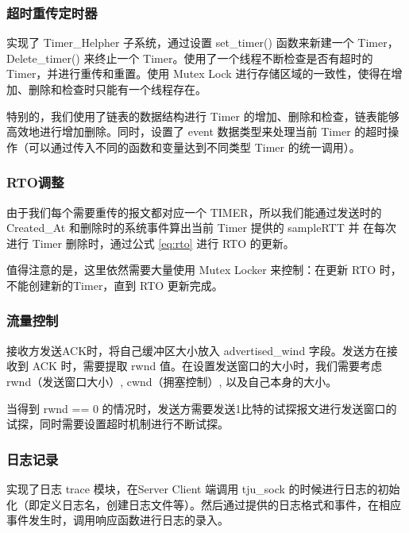 \subsubsection*{超时重传定时器}
实现了 Timer\_Helpher 子系统，通过设置 set\_timer() 函数来新建一个 Timer，Delete\_timer() 来终止一个 Timer。使用了一个线程不断检查是否有超时的Timer，并进行重传和重置。使用 Mutex Lock 进行存储区域的一致性，使得在增加、删除和检查时只能有一个线程存在。

特别的，我们使用了链表的数据结构进行 Timer 的增加、删除和检查，链表能够高效地进行增加删除。同时，设置了 event 数据类型来处理当前 Timer 的超时操作（可以通过传入不同的函数和变量达到不同类型 Timer 的统一调用）。

\subsubsection*{RTO调整}

由于我们每个需要重传的报文都对应一个 TIMER，所以我们能通过发送时的 Created\_At 和删除时的系统事件算出当前 Timer 提供的 sampleRTT 并 在每次进行 Timer 删除时，通过公式 \ref{eq:rto} 进行 RTO 的更新。

值得注意的是，这里依然需要大量使用 Mutex Locker 来控制：在更新 RTO 时，不能创建新的Timer，直到 RTO 更新完成。

\subsubsection*{流量控制}

接收方发送ACK时，将自己缓冲区大小放入 advertised\_wind 字段。发送方在接收到 ACK 时，需要提取 rwnd 值。在设置发送窗口的大小时，我们需要考虑 rwnd（发送窗口大小）, cwnd（拥塞控制）, 以及自己本身的大小。

当得到 rwnd == 0 的情况时，发送方需要发送1比特的试探报文进行发送窗口的试探，同时需要设置超时机制进行不断试探。

\subsubsection*{日志记录}

实现了日志 trace 模块，在Server Client 端调用 tju\_sock 的时候进行日志的初始化（即定义日志名，创建日志文件等）。然后通过提供的日志格式和事件，在相应事件发生时，调用响应函数进行日志的录入。



